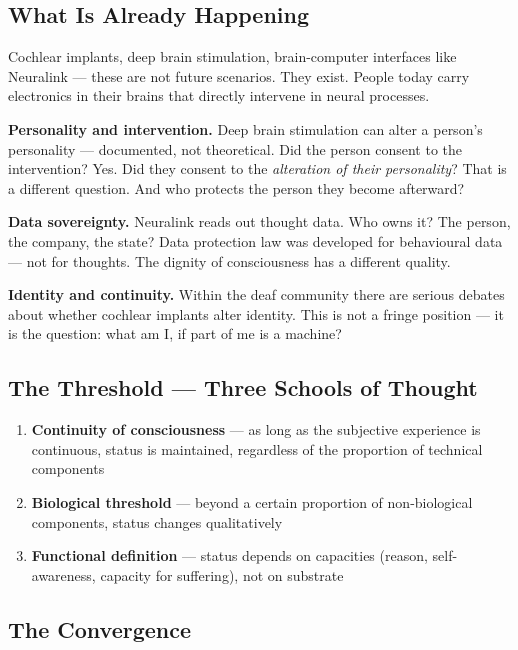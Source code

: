 \documentclass[fleqn,10pt]{SelfArx} %
\begin{document}
\subsection{What Is Already Happening}

Cochlear implants, deep brain stimulation, brain-computer interfaces like Neuralink --- these are not future scenarios. They exist. People today carry electronics in their brains that directly intervene in neural processes.

\textbf{Personality and intervention.} Deep brain stimulation can alter a person's personality --- documented, not theoretical. Did the person consent to the intervention? Yes. Did they consent to the \textit{alteration of their personality}? That is a different question. And who protects the person they become afterward?

\textbf{Data sovereignty.} Neuralink reads out thought data. Who owns it? The person, the company, the state? Data protection law was developed for behavioural data --- not for thoughts. The dignity of consciousness has a different quality.

\textbf{Identity and continuity.} Within the deaf community there are serious debates about whether cochlear implants alter identity. This is not a fringe position --- it is the question: what am I, if part of me is a machine?

\subsection{The Threshold --- Three Schools of Thought}

\begin{enumerate}[noitemsep]
\item \textbf{Continuity of consciousness} --- as long as the subjective experience is continuous, status is maintained, regardless of the proportion of technical components
\item \textbf{Biological threshold} --- beyond a certain proportion of non-biological components, status changes qualitatively
\item \textbf{Functional definition} --- status depends on capacities (reason, self-awareness, capacity for suffering), not on substrate
\end{enumerate}

\subsection{The Convergence}
\end{document}
